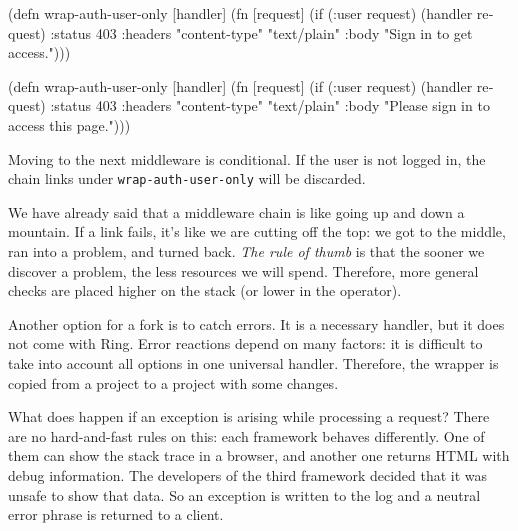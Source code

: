 
\ifx\DEVICETYPE\MOBILE

\begin{english}
  \begin{clojure}
(defn wrap-auth-user-only [handler]
  (fn [request]
    (if (:user request)
      (handler request)
      {:status 403
       :headers
       {"content-type" "text/plain"}
       :body "Sign in to get access."})))
  \end{clojure}
\end{english}

\else

\begin{english}
  \begin{clojure}
(defn wrap-auth-user-only [handler]
  (fn [request]
    (if (:user request)
      (handler request)
      {:status 403
       :headers {"content-type" "text/plain"}
       :body "Please sign in to access this page."})))
  \end{clojure}
\end{english}

\fi

Moving to the next middleware is conditional. If the user is not logged in, the chain links under \verb|wrap-auth-user-only| will be discarded.

We have already said that a middleware chain is like going up and down a mountain. If a link fails, it’s like we are cutting off the top: we got to the middle, ran into a problem, and turned back. \emph{The rule of thumb} is that the sooner we discover a problem, the less resources we will spend. Therefore, more general checks are placed higher on the stack (or lower in the \arr operator).


Another option for a fork is to catch errors. It is a necessary handler, but it does not come with Ring. Error reactions depend on many factors: it is difficult to take into account all options in one universal handler. Therefore, the wrapper is copied from a project to a project with some changes.

What does happen if an exception is arising while processing a request? There are no hard-and-fast rules on this: each framework behaves differently. One of them can show the stack trace in a browser, and another one returns HTML with debug information. The developers of the third framework decided that it was unsafe to show that data. So an exception is written to the log and a neutral error phrase is returned to a client.

